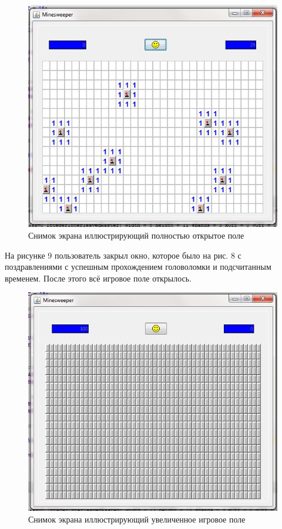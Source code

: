 \begin{figure}[H]
	\begin{center}
		\includegraphics[scale=0.7]{images/7.jpg}
		\caption{Снимок экрана иллюстрирующий полностью открытое поле} 
		\label{pic:pic_name} %
	\end{center}
\end{figure}

На рисунке 9 пользователь закрыл окно, которое было на рис. 8 с поздравлениями с успешным прохождением головоломки и подсчитанным временем. После этого всё игровое поле открылось.

\begin{figure}[H]
	\begin{center}
		\includegraphics[scale=0.7]{images/8.jpg}
		\caption{Снимок экрана иллюстрирующий увеличенное игровое поле} 
		\label{pic:pic_name} %
	\end{center}
\end{figure}

